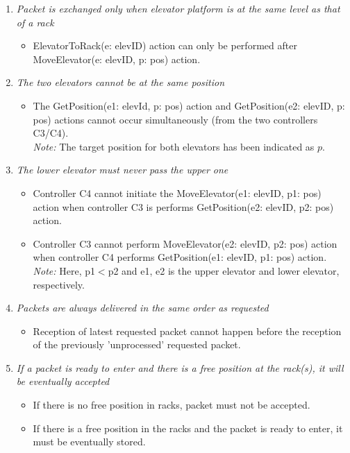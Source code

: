 \begin{enumerate}
\item \textit{Packet is exchanged only when elevator platform is at the same level as that of a rack}
	\begin{itemize}
	\item ElevatorToRack(e: elevID) action can only be performed after
	MoveElevator(e: elevID, p: pos) action.
	\end{itemize}
	
\item \textit{The two elevators cannot be at the same position}
	\begin{itemize}
	\item The GetPosition(e1: elevId, p: pos) action and
	GetPosition(e2: elevID, p: pos) actions cannot occur
	simultaneously (from the two controllers C3/C4).\\
	\textit{Note:} The target position for both elevators has been
	indicated as $p$.
	\end{itemize}
		
\item \textit{The lower elevator must never pass the upper one}
	\begin{itemize}
	\item Controller C4 cannot initiate the MoveElevator(e1: elevID, p1: pos) action when controller C3 is performs GetPosition(e2: elevID, p2: pos) action.
	\item Controller C3 cannot perform MoveElevator(e2: elevID, p2: pos) 
	action when controller C4 performs GetPosition(e1: elevID, p1: pos) 
	action.\\
	\textit{Note:} Here, p1$<$p2 and e1, e2 is the upper elevator and 
	lower elevator, respectively.
	\end{itemize}
	
	
	
\item \textit{Packets are always delivered in the same order as
	requested}	
	\begin{itemize}
	\item Reception of latest requested packet cannot happen before
	the reception of the previously 'unprocessed' requested packet.
	\end{itemize}
	
\item \textit{If a packet is ready to enter and there is a free
	position at the rack(s), it will be eventually accepted}
	\begin{itemize}
	\item If there is no free position in racks, packet must not be 
	accepted.
	\item If there is a free position in the racks and the packet is 
	ready to enter, it must be eventually stored.
	\end{itemize}
	

\end{enumerate}

